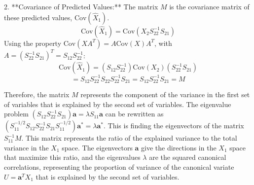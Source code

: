 2.  **Covariance of Predicted Values:** The matrix $M$ is the covariance matrix of these predicted values, $\text{Cov}(\hat{X}_1)$.
    $$ \text{Cov}(\hat{X}_1) = \text{Cov}(X_2 S_{22}^{-1}S_{21}) $$
    Using the property $\text{Cov}(XA^T) = A \text{Cov}(X) A^T$, with $A = (S_{22}^{-1}S_{21})^T = S_{12}S_{22}^{-1}$:
    $$ \text{Cov}(\hat{X}_1) = (S_{12}S_{22}^{-1}) \text{Cov}(X_2) (S_{22}^{-1}S_{21}) $$
    $$ = S_{12}S_{22}^{-1} S_{22} S_{22}^{-1}S_{21} = S_{12}S_{22}^{-1}S_{21} = M $$

Therefore, the matrix $M$ represents the component of the variance in the first set of variables that is explained by the second set of variables. The eigenvalue problem $(S_{12}S_{22}^{-1}S_{21})\mathbf{a} = \lambda S_{11}\mathbf{a}$ can be rewritten as $(S_{11}^{-1/2} S_{12}S_{22}^{-1}S_{21} S_{11}^{-1/2}) \mathbf{a}^* = \lambda \mathbf{a}^*$. This is finding the eigenvectors of the matrix $S_{11}^{-1}M$. This matrix represents the ratio of the explained variance to the total variance in the $X_1$ space. The eigenvectors $\mathbf{a}$ give the directions in the $X_1$ space that maximize this ratio, and the eigenvalues $\lambda$ are the squared canonical correlations, representing the proportion of variance of the canonical variate $U = \mathbf{a}^T X_1$ that is explained by the second set of variables.
